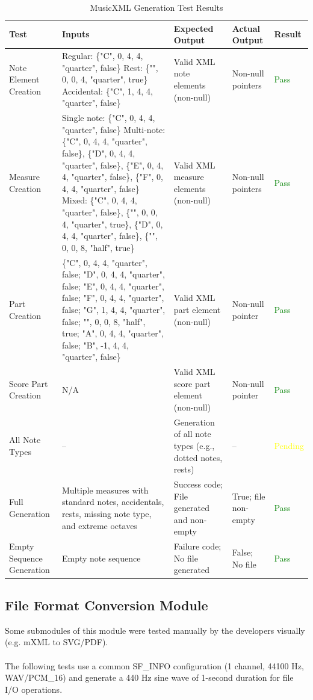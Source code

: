 \documentclass[12pt, titlepage]{article}
\begin{document}
\begin{longtable}{|L{3cm}|L{2cm}|L{2cm}|L{2cm}|l|}
  \caption{MusicXML Generation Test Results} \\
  \hline
  \textbf{Test} & \textbf{Inputs} & \textbf{Expected Output} & \textbf{Actual Output} & \textbf{Result} \\
  \hline
  Note Element Creation & 
      Regular: \{"C", 0, 4, 4, "quarter", false\}
      Rest: \{"", 0, 0, 4, "quarter", true\}
      Accidental: \{"C", 1, 4, 4, "quarter", false\} &
    Valid XML note elements (non-null) & Non-null pointers & \textcolor{green}{Pass} \\
  \hline
  Measure Creation & 
      Single note: \{"C", 0, 4, 4, "quarter", false\} 
      Multi-note: \{"C", 0, 4, 4, "quarter", false\}, \{"D", 0, 4, 4, "quarter", false\},
        \{"E", 0, 4, 4, "quarter", false\}, \{"F", 0, 4, 4, "quarter", false\} 
        Mixed: \{"C", 0, 4, 4, "quarter", false\}, \{"", 0, 0, 4, "quarter", true\},
        \{"D", 0, 4, 4, "quarter", false\}, \{"", 0, 0, 8, "half", true\}
    &
    Valid XML measure elements (non-null) & Non-null pointers & \textcolor{green}{Pass} \\
  \hline
  Part Creation & 
    \{"C", 0, 4, 4, "quarter", false; "D", 0, 4, 4, "quarter", false; 
    "E", 0, 4, 4, "quarter", false; "F", 0, 4, 4, "quarter", false; 
    "G", 1, 4, 4, "quarter", false; "", 0, 0, 8, "half", true; 
    "A", 0, 4, 4, "quarter", false; "B", -1, 4, 4, "quarter", false\} &
    Valid XML part element (non-null) & Non-null pointer & \textcolor{green}{Pass} \\
  \hline
  Score Part Creation & 
    N/A & 
    Valid XML score part element (non-null) & Non-null pointer & \textcolor{green}{Pass} \\
  \hline
  All Note Types & 
    -- & 
    Generation of all note types (e.g., dotted notes, rests) & -- & \textcolor{yellow}{Pending} \\
  \hline
  Full Generation & 
      Multiple measures with standard notes, accidentals, rests,
      missing note type, and extreme octaves
    &
      Success code; File generated and non-empty
    &
    True; file non-empty & \textcolor{green}{Pass} \\
  \hline
  Empty Sequence Generation & 
    Empty note sequence & 
    Failure code; No file generated & False; No file & \textcolor{green}{Pass} \\
  \hline
\end{longtable}

\subsection{File Format Conversion Module}
Some submodules of this module were tested manually by the developers visually (e.g. mXML to SVG/PDF). \\ \\
The following tests use a common SF\_INFO configuration (1 channel, 44100 Hz, WAV/PCM\_16) and generate a 440 Hz sine wave of 1-second duration for file I/O operations.
\end{document}
